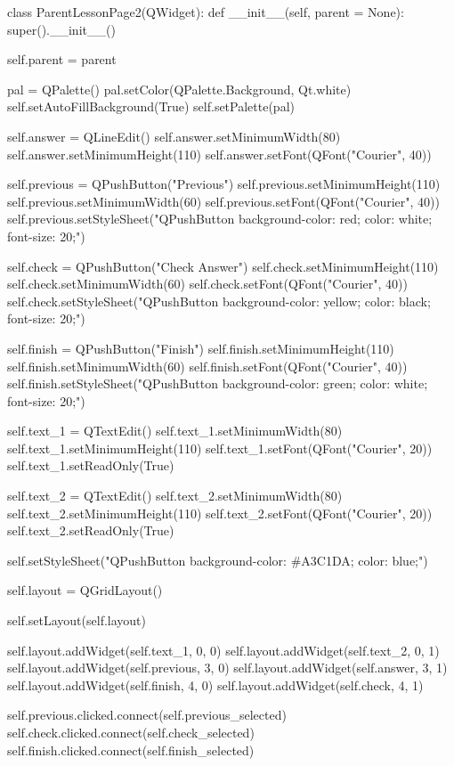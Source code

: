 \begin{python}
class ParentLessonPage2(QWidget):
    def __init__(self, parent = None):
        super().__init__()

        self.parent = parent

        pal = QPalette()
        pal.setColor(QPalette.Background, Qt.white)
        self.setAutoFillBackground(True)
        self.setPalette(pal)

        self.answer = QLineEdit()
        self.answer.setMinimumWidth(80)
        self.answer.setMinimumHeight(110)
        self.answer.setFont(QFont("Courier", 40))
        
        self.previous = QPushButton("Previous")
        self.previous.setMinimumHeight(110)
        self.previous.setMinimumWidth(60)
        self.previous.setFont(QFont("Courier", 40))
        self.previous.setStyleSheet("QPushButton {background-color: red; color: white; font-size: 20;}")
        
        self.check = QPushButton("Check Answer")
        self.check.setMinimumHeight(110)
        self.check.setMinimumWidth(60)
        self.check.setFont(QFont("Courier", 40))
        self.check.setStyleSheet("QPushButton {background-color: yellow; color: black; font-size: 20;}")
        
        self.finish = QPushButton("Finish")
        self.finish.setMinimumHeight(110)
        self.finish.setMinimumWidth(60)
        self.finish.setFont(QFont("Courier", 40))
        self.finish.setStyleSheet("QPushButton {background-color: green; color: white; font-size: 20;}")

        self.text_1 = QTextEdit()
        self.text_1.setMinimumWidth(80)
        self.text_1.setMinimumHeight(110)
        self.text_1.setFont(QFont("Courier", 20))
        self.text_1.setReadOnly(True)
        
        self.text_2 = QTextEdit()
        self.text_2.setMinimumWidth(80)
        self.text_2.setMinimumHeight(110)
        self.text_2.setFont(QFont("Courier", 20))
        self.text_2.setReadOnly(True)

        self.setStyleSheet("QPushButton {background-color: #A3C1DA; color: blue;}")

        self.layout = QGridLayout()

        self.setLayout(self.layout)

        self.layout.addWidget(self.text_1, 0, 0) 
        self.layout.addWidget(self.text_2, 0, 1)
        self.layout.addWidget(self.previous, 3, 0)
        self.layout.addWidget(self.answer, 3, 1)
        self.layout.addWidget(self.finish, 4, 0)
        self.layout.addWidget(self.check, 4, 1)

        self.previous.clicked.connect(self.previous_selected)
        self.check.clicked.connect(self.check_selected)
        self.finish.clicked.connect(self.finish_selected)
\end{python}

